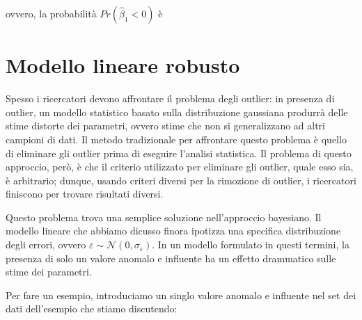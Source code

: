 \documentclass[
  11pt,
]{krantz}
\makeatletter
\newenvironment{Shaded}{\begin{snugshade}}{\end{snugshade}}
\newcommand{\CommentTok}[1]{\textcolor[rgb]{0.37,0.37,0.37}{\textit{#1}}}
\newcommand{\DecValTok}[1]{\textcolor[rgb]{0.06,0.06,0.06}{#1}}
\newcommand{\FunctionTok}[1]{\textcolor[rgb]{0,0,0}{#1}}
\newcommand{\NormalTok}[1]{#1}
\newcommand{\OtherTok}[1]{\textcolor[rgb]{0.37,0.37,0.37}{#1}}
\newcommand{\SpecialCharTok}[1]{\textcolor[rgb]{0,0,0}{#1}}
\newenvironment{kframe}{%
\medskip{}
\setlength{\fboxsep}{.8em}
 \def\at@end@of@kframe{}%
 \ifinner\ifhmode%
  \def\at@end@of@kframe{\end{minipage}}%
  \begin{minipage}{\columnwidth}%
 \fi\fi%
 \def\FrameCommand##1{\hskip\@totalleftmargin \hskip-\fboxsep
 \colorbox{shadecolor}{##1}\hskip-\fboxsep
     \hskip-\linewidth \hskip-\@totalleftmargin \hskip\columnwidth}%
 \MakeFramed {\advance\hsize-\width
   \@totalleftmargin\z@ \linewidth\hsize
   \@setminipage}}%
 {\par\unskip\endMakeFramed%
 \at@end@of@kframe}
\renewenvironment{Shaded}{\begin{kframe}}{\end{kframe}}
\theoremstyle{definition}
\theoremstyle{definition}
\theoremstyle{definition}
\theoremstyle{definition}
\theoremstyle{remark}
\makeatother
\begin{document}
ovvero, la probabilità \(Pr(\hat{\beta}_1 < 0)\) è

\begin{Shaded}
\end{Shaded}

\hypertarget{modello-lineare-robusto}{%
\section{Modello lineare robusto}\label{modello-lineare-robusto}}

Spesso i ricercatori devono affrontare il problema degli outlier: in presenza di outlier, un modello statistico basato sulla distribuzione gaussiana produrrà delle stime distorte dei parametri, ovvero stime che non si generalizzano ad altri campioni di dati. Il metodo tradizionale per affrontare questo problema è quello di eliminare gli outlier prima di eseguire l'analisi statistica. Il problema di questo approccio, però, è che il criterio utilizzato per eliminare gli outlier, quale esso sia, è arbitrario; dunque, usando criteri diversi per la rimozione di outlier, i ricercatori finiscono per trovare risultati diversi.

Questo problema trova una semplice soluzione nell'approccio bayesiano. Il modello lineare che abbiamo dicusso finora ipotizza una specifica distribuzione degli errori, ovvero \(\varepsilon \sim \mathcal{N}(0, \sigma_{\varepsilon})\). In un modello formulato in questi termini, la presenza di solo un valore anomalo e influente ha un effetto drammatico sulle stime dei parametri.

Per fare un esempio, introduciamo un singlo valore anomalo e influente nel set dei dati dell'esempio che stiamo discutendo:

\begin{Shaded}
\end{Shaded}
\end{document}
